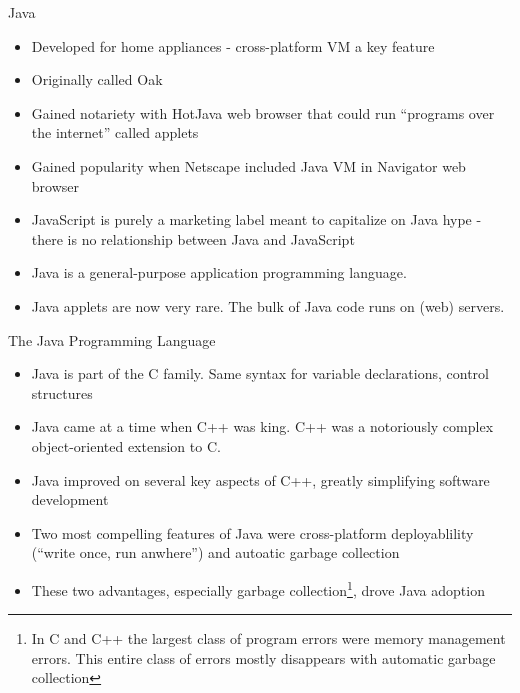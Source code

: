 \documentclass{beamer}
\title[\course] %
{\lesson}
\subtitle{}
\author[Chris Simpkins] %
{Christopher Simpkins \\\texttt{chris.simpkins@gatech.edu}}
\institute[Georgia Tech] %
\date[] %
{}
\begin{document}
\begin{frame}
  \titlepage
\end{frame}

\begin{frame}[fragile]{Java}

\begin{itemize}
\item Developed for home appliances - cross-platform VM a key feature
\item Originally called Oak
\item Gained notariety with HotJava web browser that could run ``programs over the internet'' called applets
\item Gained popularity when Netscape included Java VM in Navigator web browser
\item JavaScript is purely a marketing label meant to capitalize on Java hype - there is no relationship between Java and JavaScript
\item  Java is a general-purpose application programming language.  
\item Java applets are now very rare.  The bulk of Java code runs on (web) servers.
\end{itemize}

\end{frame}

\begin{frame}[fragile]{The Java Programming Language}


\begin{itemize}
\item Java is part of the C family.  Same syntax for variable
  declarations, control structures
\item Java came at a time when C++ was king.  C++ was a notoriously complex
  object-oriented extension to C.
\item Java improved on several key aspects of C++, greatly simplifying
  software development
\item Two most compelling features of Java were cross-platform
  deployablility (``write once, run anwhere'') and autoatic garbage
  collection
\item These two advantages, especially garbage collection\footnote{In
    C and C++ the largest class of program errors were memory
    management errors.  This entire class of errors mostly disappears
    with automatic garbage collection}, drove Java adoption
\end{itemize}

\end{frame}
\end{document}
